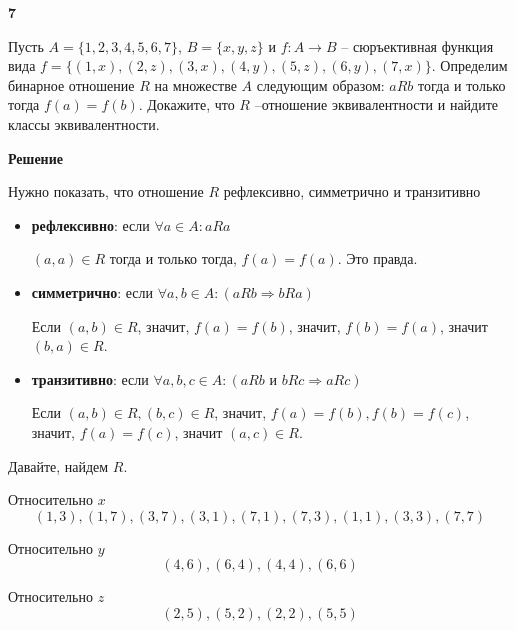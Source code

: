 \documentclass{article}
\begin{document}
\textbf{7}

Пусть $A = \{1, 2, 3, 4, 5, 6, 7\}$, $B = \{x, y, z\}$ и $f \colon A \to B$ --
сюръективная функция вида $f = \{(1, x), (2, z), (3, x), (4, y), (5, z), (6, y), (7, x)\}$.
Определим бинарное отношение $R$ на множестве $A$ следующим образом: $aRb$ тогда и только тогда $f(a) = f(b)$. Докажите, что $R$ --отношение эквивалентности и найдите классы эквивалентности.

\textbf{Решение}

Нужно показать, что отношение $R$ рефлексивно, симметрично и транзитивно

\begin{itemize}
		\item \textbf{рефлексивно}: если $\forall a \in A: aRa$ 
		
		$(a, a) \in R$ тогда и только тогда, $f(a) = f(a)$. Это правда.
		
		\item \textbf{симметрично}: если $\forall a, b \in A: (aRb \Longrightarrow bRa)$
		
		 Если $(a, b) \in R$, значит, $f(a) = f(b)$, значит, $f(b) = f(a)$, значит $(b, a) \in R$.
		
		\item \textbf{транзитивно}: если $\forall a, b, c \in A: (aRb \text{ и } bRc \Longrightarrow aRc)$
		
		Если $(a, b) \in R, (b, c) \in R$, значит, $f(a) = f(b), f(b) = f(c)$, значит, $f(a) = f(c)$, значит $(a, c) \in R$.
		
		\end{itemize}

Давайте, найдем $R$. 

Относительно $x$
$$(1, 3), (1, 7), (3, 7), (3, 1), (7, 1), (7, 3), (1, 1), (3, 3), (7, 7)$$

Относительно $y$
$$(4, 6), (6, 4), (4, 4), (6, 6)$$

Относительно $z$
$$(2, 5), (5, 2), (2, 2), (5, 5)$$
\end{document}
